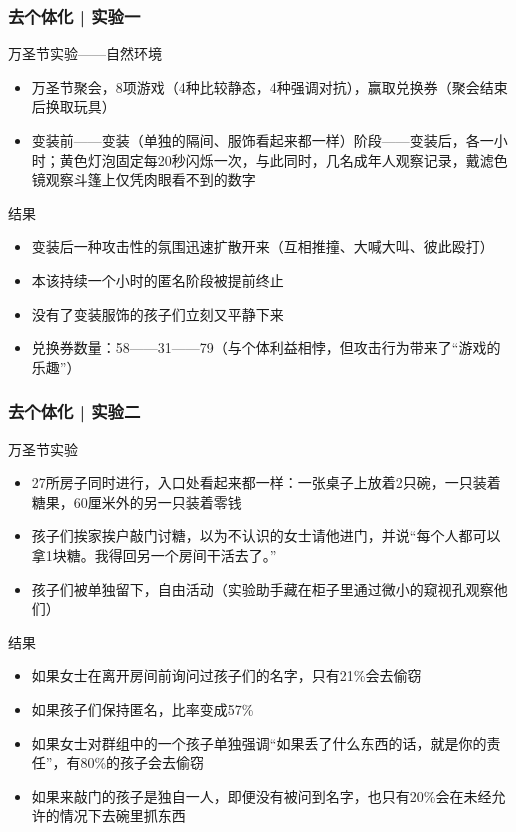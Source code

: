 \begin{frame}
  \frametitle{去个体化 | 实验一}
  \begin{block}{万圣节实验——自然环境}
    \begin{itemize}
      \item 万圣节聚会，8项游戏（4种比较静态，4种强调对抗），赢取兑换券（聚会结束后换取玩具）
      \item 变装前——变装（单独的隔间、服饰看起来都一样）阶段——变装后，各一小时；黄色灯泡固定每20秒闪烁一次，与此同时，几名成年人观察记录，戴滤色镜观察斗篷上仅凭肉眼看不到的数字
    \end{itemize}
  \end{block}
  \pause
  \begin{block}{结果}
    \begin{itemize}
      \item 变装后一种攻击性的氛围迅速扩散开来（互相推撞、大喊大叫、彼此殴打）
      \item 本该持续一个小时的匿名阶段被提前终止
      \item 没有了变装服饰的孩子们立刻又平静下来
      \item 兑换券数量：58——31——79（与个体利益相悖，但攻击行为带来了“游戏的乐趣”）
    \end{itemize}
  \end{block}
\end{frame}

\begin{frame}
  \frametitle{去个体化 | 实验二}
  \begin{block}{万圣节实验}
    \begin{itemize}
      \item 27所房子同时进行，入口处看起来都一样：一张桌子上放着2只碗，一只装着糖果，60厘米外的另一只装着零钱
      \item 孩子们挨家挨户敲门讨糖，以为不认识的女士请他进门，并说“每个人都可以拿1块糖。我得回另一个房间干活去了。”
      \item 孩子们被单独留下，自由活动（实验助手藏在柜子里通过微小的窥视孔观察他们）
    \end{itemize}
  \end{block}
  \vspace{-0.5em}
  \pause
  \begin{block}{结果}
    \begin{itemize}
      \item 如果女士在离开房间前询问过孩子们的名字，只有21\%会去偷窃
      \item 如果孩子们保持匿名，比率变成57\%
      \item 如果女士对群组中的一个孩子单独强调“如果丢了什么东西的话，就是你的责任”，有80\%的孩子会去偷窃
      \item 如果来敲门的孩子是独自一人，即便没有被问到名字，也只有20\%会在未经允许的情况下去碗里抓东西
    \end{itemize}
  \end{block}
\end{frame}

